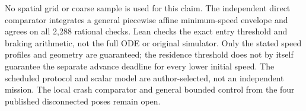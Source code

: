 \documentclass{article}
\begin{document}
No spatial grid or coarse sample is used for this claim. The
independent direct comparator integrates a general piecewise
affine minimum-speed envelope and agrees on all 2,288 rational
checks. Lean checks the exact entry threshold and braking
arithmetic, not the full ODE or original simulator. Only the
stated speed profiles and geometry are guaranteed; the
residence threshold does not by itself guarantee the separate
advance deadline for every lower initial speed. The scheduled
protocol and scalar model are author-selected, not an independent
mission. The local crash comparator and general bounded control
from the four published disconnected poses remain open.
\end{document}
